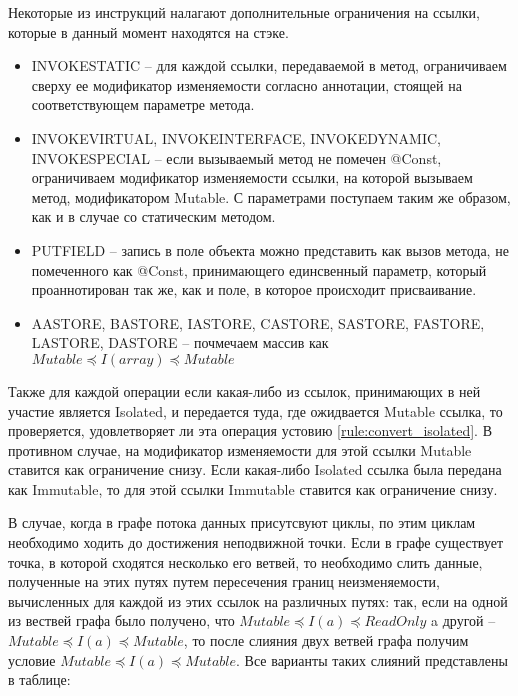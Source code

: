 Некоторые из инструкций налагают дополнительные ограничения на ссылки, которые в данный момент находятся на стэке.

\begin{itemize}
	\item INVOKESTATIC -- для каждой ссылки, передаваемой в метод, ограничиваем сверху ее модификатор изменяемости согласно аннотации, стоящей на соответствующем параметре метода.  
	\item INVOKEVIRTUAL, INVOKEINTERFACE, INVOKEDYNAMIC, INVOKESPECIAL -- если вызываемый метод не помечен @Const, ограничиваем модификатор изменяемости ссылки, на которой вызываем метод, модификатором Mutable. С параметрами поступаем таким же образом, как и в случае со статическим методом. 
	\item PUTFIELD -- запись в поле объекта можно представить как вызов метода, не помеченного как @Const, принимающего единсвенный параметр, который проаннотирован так же, как и поле, в которое происходит присваивание.
	\item AASTORE, BASTORE, IASTORE, CASTORE, SASTORE, FASTORE, LASTORE, DASTORE -- почмечаем массив как $Mutable \preceq I(array) \preceq Mutable$
\end{itemize}

Также для каждой операции если какая-либо из ссылок, принимающих в ней участие является Isolated, и передается туда, где ожидвается Mutable ссылка, то проверяется, удовлетворяет ли эта операция устовию \ref{rule:convert_isolated}. В противном случае, на модификатор изменяемости для этой ссылки Mutable ставится как ограничение снизу. Если какая-либо Isolated ссылка была передана как Immutable, то для этой ссылки Immutable ставится как ограничение снизу.   

В случае, когда в графе потока данных присутсвуют циклы, по этим циклам необходимо ходить до достижения неподвижной точки. Если в графе существует точка, в которой сходятся несколько его ветвей, то необходимо слить данные, полученные на этих путях путем пересечения границ неизменяемости, вычисленных для каждой из этих ссылок на различных путях: так, если на одной из вествей графа было получено, что $Mutable \preceq I(a) \preceq  ReadOnly$ a другой -- $Mutable \preceq I(a) \preceq  Mutable$, то после слияния двух ветвей графа получим условие $Mutable \preceq I(a) \preceq  Mutable$. Все варианты таких слияний представлены в таблице:

